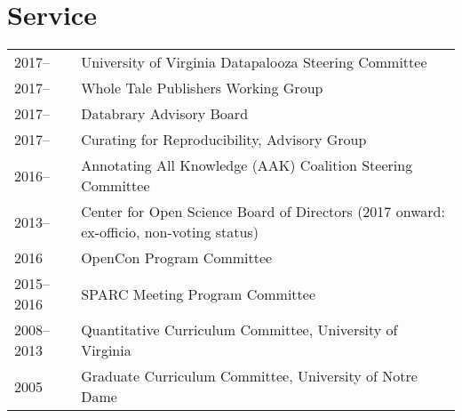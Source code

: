 \documentclass[11pt]{article}
\begin{document}
\section*{Service}
\begin{tabularx}{\textwidth}{lX}
2017--		& University of Virginia Datapalooza Steering Committee\\
2017--		& Whole Tale Publishers Working Group\\
2017--		& Databrary Advisory Board\\
2017--              	& Curating for Reproducibility, Advisory Group\\
2016--      		& Annotating All Knowledge (AAK) Coalition Steering Committee\\
2013--		& Center for Open Science Board of Directors (2017 onward: ex-officio, non-voting status)\\
2016	      		& OpenCon Program Committee\\
2015--2016  	& SPARC Meeting Program Committee\\
2008--2013  	& Quantitative Curriculum Committee, University of Virginia\\
2005        		& Graduate Curriculum Committee, University of Notre Dame\\
\end{tabularx}
\end{document}
